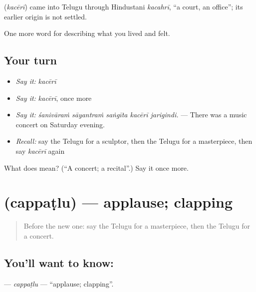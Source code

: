 \begin{cousinweb}
\textbf{} (\emph{kacērī}) came into Telugu through Hindustani \emph{kacahrī}, \textquotedblleft{}a court, an office\textquotedblright{}; its earlier origin is not settled.
\end{cousinweb}

\begin{grammarlens}[title={What you've built}]
One more word for describing what you lived and felt.
\end{grammarlens}

\subsection*{Your turn}
\begin{itemize}
\raggedright
  \item \emph{Say it:} \emph{kacērī}
  \item \emph{Say it:} \emph{kacērī}, once more
  \item \emph{Say it:} \emph{śanivāraṁ sāyantraṁ saṅgīta kacērī jarigindi.} — There was a music concert on Saturday evening.
  \item \emph{Recall:} say the Telugu for a sculptor, then the Telugu for a masterpiece, then say \emph{kacērī} again
\end{itemize}

\begin{tcolorbox}[breakable,colback=teal!4,colframe=teal!35!black,title={Before you move on}]
What does  mean? (\textquotedblleft{}A concert; a recital\textquotedblright{}.) Say it once more.
\end{tcolorbox}
\section[\texorpdfstring{\te{చప్పట్లు} (cappaṭlu)}{చప్పట్లు (cappaṭlu)}]{ (cappaṭlu) — applause; clapping}

\label{lesson:TE-C543-cappatlu}



\begin{quote}
Before the new one: say the Telugu for a masterpiece, then the Telugu for a concert.
\end{quote}

\subsection*{You'll want to know: }
\textbf{} — \emph{cappaṭlu} — \textquotedblleft{}applause; clapping\textquotedblright{}.

